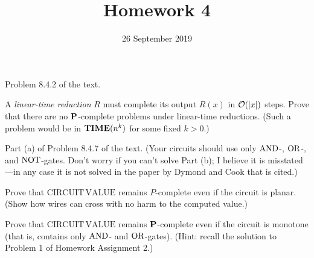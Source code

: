 \documentclass{../math167}
\title{Homework 4}
\author{}
\date{26 September 2019}
\begin{document}
\begin{problems}
\item Problem 8.4.2 of the text.

  \begin{book}
    A \emph{linear-time reduction} \(R\) must complete its output
    \(R(x)\) in \(\O(\abs x)\) steps.  Prove that there are no
    \(\P\)-complete problems under linear-time reductions.  (Such a
    problem would be in \(\TIME(n^k)\) for some fixed \(k>0\).)
  \end{book}

  \begin{solution}
  \end{solution}

\item Part (a) of Problem 8.4.7 of the text.  (Your circuits should
  use only \(\AND\)-, \(\OR\)-, and \(\NOT\)-gates.  Don't worry if
  you can't solve Part (b); I believe it is misstated---in any case it
  is not solved in the paper by Dymond and Cook that is cited.)

  \begin{book}
    \begin{problems}
    \item Prove that \(\mathrm{CIRCUIT\,VALUE}\) remains
      \(P\)-complete even if the circuit is planar.  (Show how wires
      can cross with no harm to the computed value.)
    \end{problems}
  \end{book}

  \begin{solution}
  \end{solution}

\item Prove that \(\mathrm{CIRCUIT\,VALUE}\) remains \(\P\)-complete
  even if the circuit is monotone (that is, contains only \(\AND\)-
  and \(\OR\)-gates).  (Hint: recall the solution to Problem 1 of
  Homework Assignment 2.)

  \begin{solution}
  \end{solution}

\end{problems}
\end{document}

